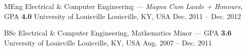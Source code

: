 

\begin{cventries}

  \cventry
    {MEng Electrical \& Computer Engineering \textnormal{--- \textit{Magna Cum Laude + Honours}, GPA \textbf{4.0}}} %
    {University of Louisville} %
    {Louisville, KY, USA} %
    {Dec. 2011 -- Dec. 2012} %
    {}

  \cventry
    {BSc Electrical \& Computer Engineering, Mathematics Minor \textnormal{--- GPA \textbf{3.6}}} %
    {University of Louisville} %
    {Louisville, KY, USA} %
    {Aug. 2007 -- Dec. 2011} %
    {}

\end{cventries}
